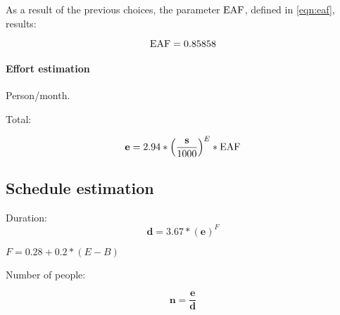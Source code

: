 As a result of the previous choices, the parameter $ \text{EAF} $, defined in \cref{eqn:eaf}, results:

\begin{equation}
	\text{EAF} = 0.85858	
\end{equation}





\paragraph{Effort estimation}

Person/month.

Total:

\begin{equation}
%
	\mEffort = 2.94 * { \left( \frac{\mSize}{1000} \right) }^{E} * \eaf
%
\end{equation}









\subsection{Schedule estimation}

Duration:\begin{equation}%
%
\mathbf{d} = 3.67 * {\left(\mathbf{e}\right)}^F
%
\end{equation}

$ F = 0.28 + 0.2 * \left( E - B \right) $


Number of people:

\begin{equation}
\mathbf{n} = \frac{\mathbf{e}}{\mathbf{d}}
\end{equation}











